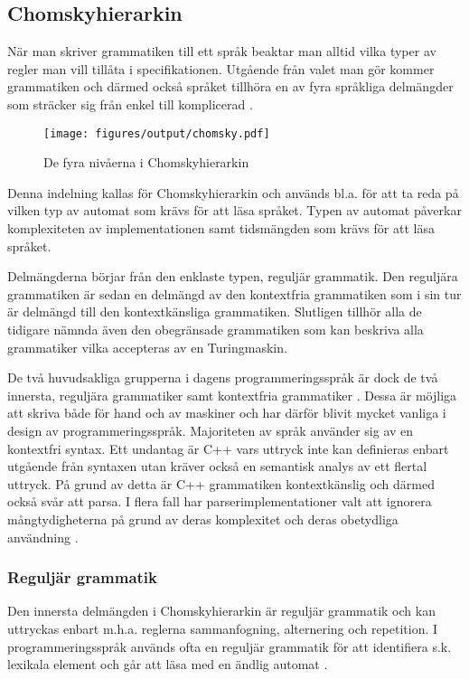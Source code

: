 \subsection{Chomskyhierarkin}

När man skriver grammatiken till ett språk beaktar man alltid vilka
typer av regler man vill tillåta i specifikationen. Utgående från valet man
gör kommer grammatiken och därmed också språket tillhöra en av fyra språkliga
delmängder som sträcker sig från enkel till komplicerad \citep[s. 19]{gd08}.

\begin{figure}[ht]
  \texttt{[image: figures/output/chomsky.pdf]}
  \caption{De fyra nivåerna i Chomskyhierarkin}
\end{figure}

Denna indelning kallas för Chomskyhierarkin och används bl.a. för att ta reda
på vilken typ av automat som krävs för att läsa språket. Typen av automat
påverkar komplexiteten av implementationen samt tidsmängden som krävs för att
läsa språket.

Delmängderna börjar från den enklaste typen, reguljär grammatik. Den
reguljära grammatiken är sedan en delmängd av den kontextfria grammatiken som i
sin tur är delmängd till den kontextkänsliga grammatiken. Slutligen tillhör
alla de tidigare nämnda även den obegränsade grammatiken som kan
beskriva alla grammatiker vilka accepteras av en Turingmaskin.

De två huvudsakliga grupperna i dagens programmeringsspråk är dock de två
innersta, reguljära grammatiker samt kontextfria grammatiker \citep[s.
100]{sm09}. Dessa är möjliga att skriva både för hand och av maskiner och har
därför blivit mycket vanliga i design av programmeringsspråk. Majoriteten av
språk använder sig av en kontextfri syntax. Ett undantag är C++ vars
uttryck inte kan definieras enbart utgående från syntaxen utan kräver också en
semantisk analys av ett flertal uttryck. På grund av detta är C++ grammatiken
kontextkänslig och därmed också svår att parsa. I flera fall har
parserimplementationer valt att ignorera mångtydigheterna på grund av deras
komplexitet och deras obetydliga användning \citep[s. 2]{rt05}.

\subsubsection{Reguljär grammatik}

Den innersta delmängden i Chomskyhierarkin är reguljär grammatik och kan uttryckas
enbart m.h.a. reglerna sammanfogning, alternering och repetition. I
programmeringsspråk används ofta en reguljär grammatik för att identifiera
s.k. lexikala element och går att läsa med en ändlig automat \citep[s.
100]{sm09}.


